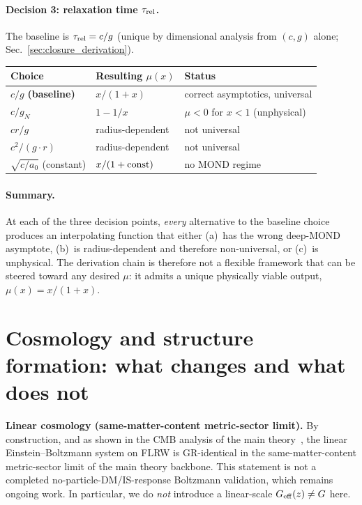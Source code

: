 \documentclass[11pt]{article}
\begin{document}
\paragraph{Decision 3: relaxation time $\tau_{\rm rel}$.}
The baseline is $\tau_{\rm rel}=c/g$ (unique by dimensional
analysis from $(c,g)$ alone; Sec.~\ref{sec:closure_derivation}).
\begin{center}
\begin{tabular}{@{}lll@{}}
\toprule
\textbf{Choice} & \textbf{Resulting $\mu(x)$} &
  \textbf{Status} \\
\midrule
$c/g$ \textbf{(baseline)} & $x/(1+x)$ &
  correct asymptotics, universal \\
$c/g_N$ & $1-1/x$ &
  $\mu<0$ for $x<1$ (unphysical) \\
$cr/g$ & radius-dependent &
  not universal \\
$c^2/(g\cdot r)$ & radius-dependent &
  not universal \\
$\sqrt{c/a_0}$ (constant) & $x/(1+{\rm const})$ &
  no MOND regime \\
\bottomrule
\end{tabular}
\end{center}

\paragraph{Summary.}
At each of the three decision points, \emph{every} alternative
to the baseline choice produces an interpolating function that
either (a)~has the wrong deep-MOND asymptote, (b)~is
radius-dependent and therefore non-universal, or (c)~is
unphysical.  The derivation chain is therefore not a flexible
framework that can be steered toward any desired $\mu$: it
admits a unique physically viable output, $\mu(x)=x/(1+x)$.

\section{Cosmology and structure formation: what changes and what does not}\label{sec:lss}
\textbf{Linear cosmology (same-matter-content metric-sector limit).} By construction, and as shown in the CMB analysis of the main theory~\cite{Lotishvili2026}, the linear Einstein--Boltzmann system on FLRW is GR-identical in the same-matter-content metric-sector limit of the main theory backbone. This statement is not a completed no-particle-DM/IS-response Boltzmann validation, which remains ongoing work. In particular, we do \emph{not} introduce a linear-scale $G_{\rm eff}(z)\neq G$ here.
\end{document}
